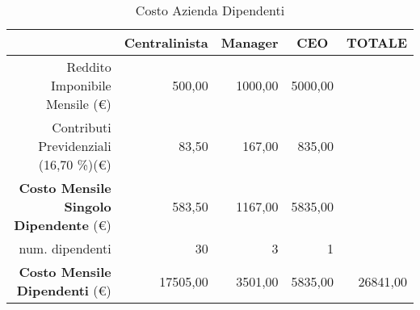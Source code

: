 \begin{savenotes}
\begin{table}[htb]
\centering
 \caption{Costo Azienda Dipendenti}
 \begin{tabular}{rD{,}{,}{5.2}D{,}{,}{5.2}D{,}{,}{5.2}D{,}{,}{5.2}}
 \toprule
 	&  &  &  &  \\
 \midrule
 	Reddito Imponibile Mensile (\euro)& 500,00 & 1000,00 & 5000,00 & \\ 
	Contributi Previdenziali (16,70 \%)(\euro) & 83,50 & 167,00 & 835,00 & \\
	\textbf{Costo Mensile Singolo Dipendente} (\euro) & 583,50 & 1167,00 & 5835,00 & \\ 	
	num. dipendenti & 30 & 3 & 1 & \\
	\textbf{Costo Mensile Dipendenti} (\euro) & 17505,00 & 3501,00 & 5835,00 & 26841,00\\ 	
 \bottomrule
 \end{tabular} 
\end{table}
\end{savenotes}

\begin{comment}

\begin{savenotes}
\begin{table}[htb]
\centering
 \caption{Situazione Stipendi Dipendenti}
 \begin{tabular}{rD{,}{,}{5.2}D{,}{,}{5.2}D{,}{,}{5.2}D{,}{,}{5.2}}
 \toprule
 	& \multicolumn{1}{c}{Centralinista} & \multicolumn{1}{c}{Manager} & \multicolumn{1}{c}{CEO} & \multicolumn{1}{c}{\textbf{TOTALE}} \\
 \midrule
 	Reddito Imponibile Mensile (\euro)& 500,00 & 1000,00 & 5000,00 & 6500,00\\ 
 	aliquota Imposta sui Redditi (\%) &  13,00 & 23,00 & 23,00 & \- \\
 	quota Imposta sui Redditi (\euro)& 36,43\footnote{(500,00-219,77)*0,13} & 201,43\footnote{(1000,00-952,31)*0,23+95,23} & 1026,19 \footnote{(5000,00-952,31)*0,23+95,23}& 1168,82\\
 	stipendio mensile lordo (\euro)& 536,43 & 1106,20 & 6026,19 & 7668,82\\
 	stipendio annuale lordo (\euro)& 6437,16 & 13274,40 & 72314,28 & 92025,84\\
 	numero dipendenti & 30 & 3 & 1 & 34\\ 
 	\textbf{TOTALE stipendio mensile lordo (\euro)}& 16092,89 & 3318,60 & 6026,19 & 25437,68\\
 	\textbf{TOTALE stipendio annuale lordo (\euro)}& 193114,68 & 39823,20 & 72314,28 & 305252,16\\
 \bottomrule
 \end{tabular} 
\end{table}
\end{savenotes}
\end{comment}
